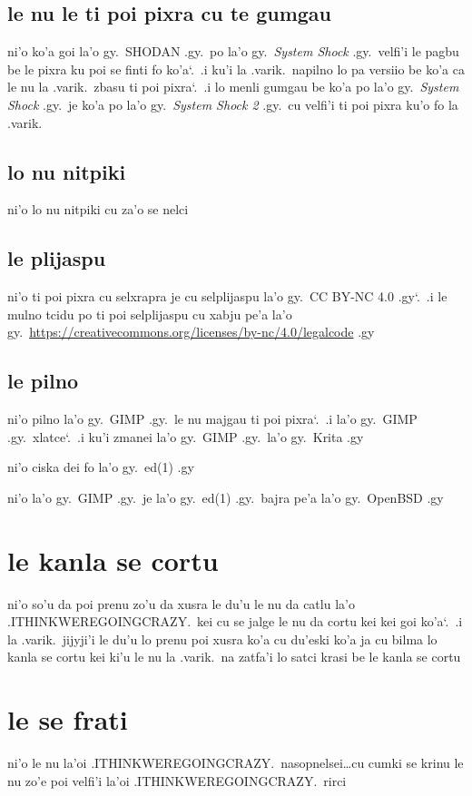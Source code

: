 \documentclass{report}
\newcommand\sds{\spacefactor\sfcode`.\ \space}
\begin{document}
\subsection{le nu le ti poi pixra cu te gumgau}
ni'o ko'a goi la'o gy.\ SHODAN .gy.\ po la'o gy.\ \textit{System Shock} .gy.\ velfi'i le pagbu be le pixra ku poi se finti fo ko'a\sds  .i ku'i la .varik.\ napilno lo pa versiio be ko'a ca le nu la .varik.\ zbasu ti poi pixra\sds  .i lo menli gumgau be ko'a po la'o gy.\ \textit{System Shock} .gy.\ je ko'a po la'o gy.\ \textit{System Shock 2} .gy.\ cu velfi'i ti poi pixra ku'o fo la .varik.
\subsection{lo nu nitpiki}
ni'o lo nu nitpiki cu za'o se nelci

\subsection{le plijaspu}
ni'o ti poi pixra cu selxrapra je cu selplijaspu la'o gy.\ CC BY-NC 4.0 .gy\sds  .i le mulno tcidu po ti poi selplijaspu cu xabju pe'a la'o gy.\ \url{https://creativecommons.org/licenses/by-nc/4.0/legalcode} .gy

\subsection{le pilno}
ni'o pilno la'o gy.\ GIMP .gy.\ le nu majgau ti poi pixra\sds  .i  la'o gy.\ GIMP .gy.\ xlatce\sds  .i ku'i zmanei la'o gy.\ GIMP .gy.\ la'o gy.\ Krita .gy

ni'o ciska dei fo la'o gy.\ ed(1) .gy

ni'o la'o gy.\ GIMP .gy.\ je la'o gy.\ ed(1) .gy.\ bajra pe'a la'o gy.\ OpenBSD .gy

\section{le kanla se cortu}
ni'o so'u da poi prenu zo'u da xusra le du'u le nu da catlu la'o .ITHINKWEREGOINGCRAZY.\ kei cu se jalge le nu da cortu kei kei goi ko'a\sds  .i la .varik.\ jijyji'i le du'u lo prenu poi xusra ko'a cu du'eski ko'a ja cu bilma lo kanla se cortu kei ki'u le nu la .varik.\ na zatfa'i lo satci krasi be le kanla se cortu

\section{le se frati}
ni'o le nu la'oi .ITHINKWEREGOINGCRAZY.\ nasopnelsei\ldots cu cumki se krinu le nu zo'e poi velfi'i la'oi .ITHINKWEREGOINGCRAZY.\ rirci
\end{document}
